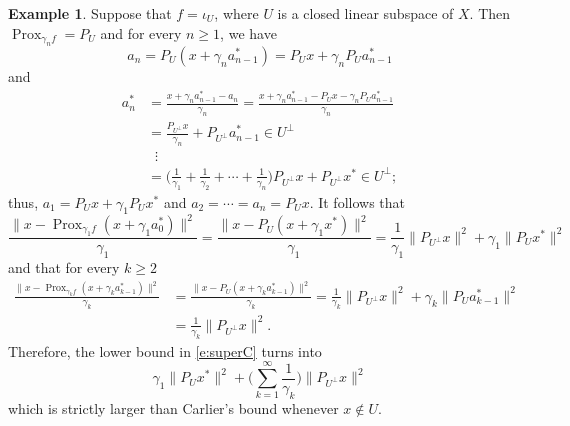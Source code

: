 \documentclass[12pt]{article}
\newcommand{\prox}{\ensuremath{\operatorname{Prox}}}
\theoremstyle{definition}
\newtheorem{example}[theorem]{Example}
\begin{document}
{\begin{example}
Suppose that $f=\iota_U$, where $U$ is a closed linear subspace of $X$.
Then $\prox_{\gamma_nf} = P_U$ and 
for every $n\geq 1$, we have 
\begin{equation}
a_n = P_U(x+\gamma_n a_{n-1}^*) = P_Ux + \gamma_n P_Ua_{n-1}^* 
\end{equation}
and 
\begin{subequations}
\begin{align}
a_n^* 
&= \frac{x+\gamma_n a_{n-1}^*-a_n }{\gamma_n} 
= \frac{x+\gamma_na_{n-1}^*-P_Ux-\gamma_nP_Ua_{n-1}^*}{\gamma_n}\\
&= \frac{P_{U^\perp}x}{\gamma_n}+P_{U^\perp}a_{n-1}^*\in U^\perp\\
&\;\; \vdots\\
&=\bigg(\frac{1}{\gamma_1}+\frac{1}{\gamma_2}+\cdots+\frac{1}{\gamma_n}\bigg)P_{U^\perp}x + P_{U^\perp}x^*\in U^\perp;
\end{align}
\end{subequations}
thus, 
$a_1 = P_Ux+\gamma_1P_Ux^*$
and
$a_2 = \cdots = a_n = P_Ux$.
It follows that 
\begin{equation}
\frac{\|x-\prox_{\gamma_1f}(x+\gamma_1a_{0}^*)\|^2}{\gamma_1}
= \frac{\|x-P_{U}(x+\gamma_1x^*)\|^2}{\gamma_1}
= \frac{1}{\gamma_1}\|P_{U^\perp}x\|^2 + \gamma_1\|P_{U}x^*\|^2
\end{equation}
and that for every $k\geq 2$
\begin{subequations}
\begin{align}
\frac{\|x-\prox_{\gamma_kf}(x+\gamma_ka_{k-1}^*)\|^2}{\gamma_k}
&=\frac{\|x-P_{U}(x+\gamma_ka_{k-1}^*)\|^2}{\gamma_k}
= \frac{1}{\gamma_k}\|P_{U^\perp}x\|^2+\gamma_k\|P_Ua_{k-1}^*\|^2\\
&= \frac{1}{\gamma_k}\|P_{U^\perp}x\|^2. 
\end{align}
\end{subequations}
Therefore, the lower bound in \cref{e:superC} turns into 
\begin{equation}
\gamma_1\|P_Ux^*\|^2 + \bigg(\sum_{k=1}^\infty \frac{1}{\gamma_k}\bigg)\|P_{U^\perp}x\|^2
\end{equation}
which is strictly larger than Carlier's bound whenever $x\notin U$. 
\end{example}


}
\end{document}
